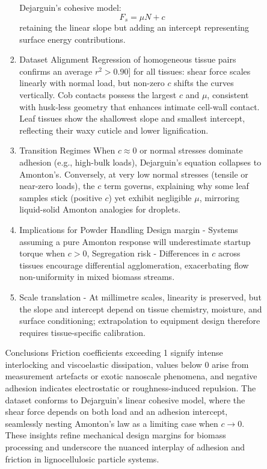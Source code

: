 \documentclass[xcolor=dvipsnames,10pt,hidelinks]{article}
\begin{document}
\begin{itemize}
\begin{itemize}
\begin{itemize}
\begin{enumerate}
Dejarguin's cohesive model:
\[F_s = \mu N + c\]
retaining the linear slope but adding an intercept representing surface energy contributions.

\item Dataset Alignment
Regression of homogeneous tissue pairs confirms an average \(r^2 > 0.90]\) for all tissues:
shear force scales linearly with normal load, but non-zero \(c\) shifts the curves vertically.
Cob contacts possess the largest \(c\) and \(\mu\), consistent with husk-less geometry that enhances intimate cell-wall contact.
Leaf tissues show the shallowest slope and smallest intercept, reflecting their waxy cuticle and lower lignification.

\item Transition Regimes
When \(c\approx 0\) or normal stresses dominate adhesion (e.g., high-bulk loads), Dejarguin's equation collapses to Amonton's.
Conversely, at very low normal stresses (tensile or near-zero loads), the \(c\) term governs,
explaining why some leaf samples stick (positive \(c\)) yet exhibit negligible \(\mu\), mirroring liquid-solid Amonton analogies for droplets.

\item Implications for Powder Handling
Design margin - Systems assuming a pure Amonton response will underestimate startup torque when \(c > 0\),
Segregation risk - Differences in \(c\) across tissues encourage differential agglomeration, exacerbating flow non-uniformity in mixed biomass streams.

\item Scale translation - At millimetre scales, linearity is preserved, but the slope and intercept depend on tissue chemistry, moisture, and surface conditioning; extrapolation to equipment design therefore requires tissue-specific calibration.
\end{enumerate}

Conclusions
Friction coefficients exceeding 1 signify intense interlocking and viscoelastic dissipation, values below 0 arise from measurement artefacts or exotic nanoscale phenomena, and negative adhesion indicates electrostatic or roughness-induced repulsion.
The dataset conforms to Dejarguin's linear cohesive model, where the shear force depends on both load and an adhesion intercept, seamlessly nesting Amonton's law as a limiting case when \(c \to 0\).
These insights refine mechanical design margins for biomass processing and underscore the nuanced interplay of adhesion and friction in lignocellulosic particle systems.
\endgroup
\newpage
\end{itemize}
\end{itemize}
\end{itemize}
\end{document}
